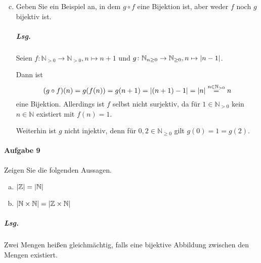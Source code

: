 \documentclass{scrreprt}
\begin{document}
\begin{enumerate}[(a)]
\setcounter{enumi}{2}
\item Geben Sie ein Beispiel an, in dem $g \circ f$ eine Bijektion ist, aber
  weder $f$ noch $g$ bijektiv ist.

  \subparagraph{Lsg.} Seien $f \colon \mathbb{N}_{> 0} \to \mathbb{N}_{> 0},
  n \mapsto n + 1$ und $g \colon \mathbb{N}_{n \geq 0} \to \mathbb{N}_{\geq 0},
  n \mapsto \abs{n - 1}$.

  Dann ist
  \[
    (g \circ f)(n) = g(f(n)) = g(n + 1) = \abs{(n + 1) - 1} = \abs{n}
    \overset{n \in \mathbb{N}_{> 0}}= n
  \]
  eine Bijektion.
  Allerdings ist $f$ selbst nicht surjektiv, da für $1 \in \mathbb{N}_{> 0}$ kein
  $n \in \mathbb{N}$ existiert mit $f(n) = 1$.

  Weiterhin ist $g$ nicht injektiv, denn für $0, 2 \in \mathbb{N}_{\geq 0}$
  gilt $g(0) = 1 = g(2)$.
\end{enumerate}

\newpage
\paragraph{Aufgabe 9} Zeigen Sie die folgenden Aussagen.
\begin{enumerate}[(a)]
\item $\abs{\mathbb{Z}} = \abs{\mathbb{N}}$
\item $\abs{\mathbb{N} \times \mathbb{N}} = \abs{\mathbb{Z} \times \mathbb{N}}$
\end{enumerate}

\subparagraph{Lsg.} Zwei Mengen heißen gleichmächtig, falls eine bijektive
Abbildung zwischen den Mengen existiert.
\end{document}
